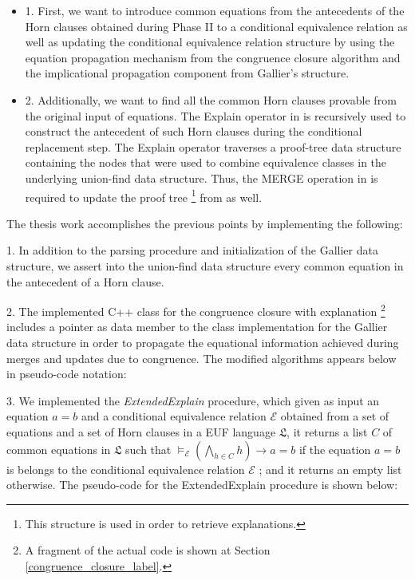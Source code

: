 \begin{itemize}
  \item[] 1. First, we want to introduce 
    common equations from the antecedents of 
    the Horn clauses obtained during Phase II
    to a conditional equivalence relation as well
    as updating the conditional equivalence relation 
    structure by using the equation propagation mechanism
    from the congruence closure algorithm and 
    the implicational propagation component 
    from Gallier's structure.
  \item[] 2. Additionally, we want to find all the common
    Horn clauses provable from the original input 
    of equations. The Explain operator in 
    \cite{10.1007/978-3-540-32033-3_33} is recursively 
    used to construct 
    the antecedent of such Horn clauses during the 
    conditional replacement step. The Explain operator 
    traverses a proof-tree data structure containing the nodes
    that were used to combine equivalence classes 
    in the underlying union-find data structure.
    Thus, the MERGE operation in \cite{GALLIER1987233} is
    required to update the proof tree 
    \footnote{This structure is used in order to retrieve
    explanations.}
    from \cite{10.1007/978-3-540-32033-3_33} as well.
\end{itemize}

The thesis work accomplishes the previous
points by implementing the following:

  1. In addition to the parsing procedure
    and initialization of the Gallier data structure,
    we assert into the union-find data structure 
    every common equation in the 
    antecedent of a Horn clause.

  2. The implemented C++ class for 
    the congruence closure with explanation 
    \footnote{
      A fragment of the actual code is shown
      at Section \ref{congruence_closure_label}.
    } 
    includes a pointer as data member to the 
    class implementation
    for the Gallier data structure in order to propagate 
    the equational information achieved during
    merges and updates due to congruence. The modified 
    algorithms appears below in pseudo-code notation:

    
    
    

  3. We implemented the \emph{ExtendedExplain}
    procedure, which given as input an equation $a = b$ and a
    conditional equivalence relation $\mathcal{E}$ obtained
    from a set of equations and a set of Horn clauses
    in a EUF language $\mathfrak{L}$,
    it returns a list $C$ of common equations in $\mathfrak{L}$
    such that
    $\models_{\mathcal{E}} (\bigwedge_{h \in C} h) \rightarrow a = b$
    if the equation $a = b$ is belongs to the 
    conditional equivalence relation $\mathcal{E}$ ; 
    and it returns an empty list
    otherwise. 
    The pseudo-code
    for the ExtendedExplain procedure is shown 
    below:

